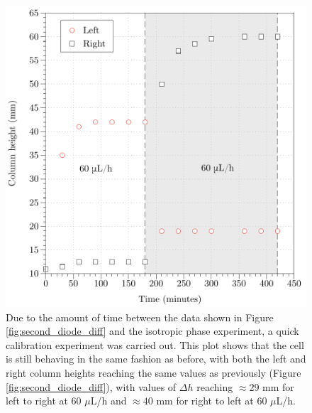 \begin{figure}
\begin{center}
\includegraphics{Figures/Diode/second_diode/isotropic/check_same_as_before}
\end{center}
\caption[Second diode repeat experiment]{\label{fig:isotropic_check} Due to the amount of time between the data shown in Figure \ref{fig:second_diode_diff} and the isotropic phase experiment, a quick calibration experiment was carried out. This plot shows that the cell is still behaving in the same fashion as before, with both the left and right column heights reaching the same values as previously (Figure \ref{fig:second_diode_diff}), with values of $\Delta h$ reaching $\approx29$ mm for left to right at 60 $\mu$L/h and $\approx40$ mm for right to left at 60 $\mu$L/h.}
\end{figure}

